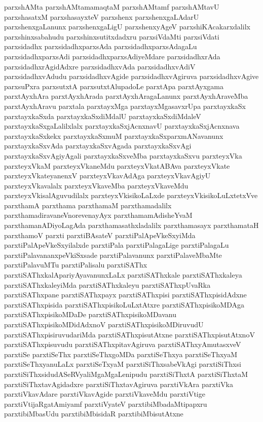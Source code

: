 {parxshAMta
parxshAMtamamaqtaM
parxshAMtamf
parxshAMtavU
parxshasatxM
parxshasayxteV
parxshenx
parxshenxgaLAdarU
parxshenxgaLanunx
parxshenxgaLigU
parxshenxyAgeV
parxshiKAcakarxdalilx
parxshinxsabahudu
parxshinxsutitxdadxru
parxsiVdaMti
parxsiVdati
parxsidadhx
parxsidadhxparxsAda
parxsidadhxparxsAdagaLu
parxsidadhxparxsAdi
parxsidadhxparxsAdiyeMdare
parxsidadhxrAda
parxsidadhxrAgidAdxre
parxsidadhxvAda
parxsidadhxvAdiV
parxsidadhxvAdudu
parxsidadhxvAgide
parxsidadhxvAgiruva
parxsidadhxvAgive
parxsuPxra
parxsutxtA
parxsutxtAlupadoLe
parxtApa
parxtAyxgama
parxtAyxhAra
parxtAyxhArada
parxtAyxhAragaLanunx
parxtAyxhAraveMba
parxtAyxhAravu
parxtala
parxtayxMga
parxtayxMgasavxrUpa
parxtayxkaSx
parxtayxkaSxda
parxtayxkaSxdiMdalU
parxtayxkaSxdiMdaleV
parxtayxkaSxgaLalilxlalx
parxtayxkaSxjAcnxnavU
parxtayxkaSxjAcnxnava
parxtayxkaSxkekx
parxtayxkaSxmuM
parxtayxkaSxparxmANavanunx
parxtayxkaSxvAda
parxtayxkaSxvAgada
parxtayxkaSxvAgi
parxtayxkaSxvAgiyAgali
parxtayxkaSxveMba
parxtayxkaSxvu
parxteyxVka
parxteyxVkaM
parxteyxVkaneMdu
parxteyxVkatABAva
parxteyxVkate
parxteyxVkateyanenxV
parxteyxVkavAdAga
parxteyxVkavAgiyU
parxteyxVkavalalx
parxteyxVkaveMba
parxteyxVkaveMdu
parxteyxVkisalAguvudilalx
parxteyxVkisikoLaLxde
parxteyxVkisikoLuLxtetxVve
parxthamA
parxthama
parxthamaM
parxthamadalilx
parxthamadiravaneVnorevenayAyx
parxthamamAdisheYvaM
parxthamanADiyoLagAda
parxthamasathxladalilx
parxthamasayx
parxthamataH
parxthamoV
parxti
parxtiBAsateV
parxtiPalApeVkeSxyiMda
parxtiPalApeVkeSxyilalxde
parxtiPala
parxtiPalagaLige
parxtiPalagaLu
parxtiPalavananxpeVkiSxsade
parxtiPalavanunx
parxtiPalaveMbaMte
parxtiPalavuMTu
parxtiPalisalu
parxtiSAThx
parxtiSAThxkalApariyAyavanunxLaLx
parxtiSAThxkale
parxtiSAThxkaleya
parxtiSAThxkaleyiMda
parxtiSAThxkaleyu
parxtiSAThxpUvaRka
parxtiSAThxpane
parxtiSAThxpayx
parxtiSAThxpisi
parxtiSAThxpisidAdxne
parxtiSAThxpisida
parxtiSAThxpisikoLuLxtAtxre
parxtiSAThxpisikoMDAga
parxtiSAThxpisikoMDaDe
parxtiSAThxpisikoMDavanu
parxtiSAThxpisikoMDidAdxnoV
parxtiSAThxpisikoMDiruvudU
parxtiSAThxpisiruvudariMda
parxtiSAThxpisutAtxne
parxtiSAThxpisutAtxnoV
parxtiSAThxpisuvudu
parxtiSAThxpitavAgiruva
parxtiSAThxyAmutasxveV
parxtiSe
parxtiSeThx
parxtiSeThxgoMDa
parxtiSeThxya
parxtiSeThxyaM
parxtiSeThxyanuLaLx
parxtiSeTxyaM
parxtiSiThxsabeVkAgi
parxtiSiThxsi
parxtiSiThxsidudASeRVyaliMgaMgaLenipudu
parxtiSiThxtA
parxtiSiThxtaM
parxtiSiThxtavAgidadxre
parxtiSiThxtavAgiruva
parxtiVkAra
parxtiVka
parxtiVkavAdare
parxtiVkavAgide
parxtiVkaveMdu
parxtiVtige
parxtiVtijaRgatAmiyamf
parxtiVyateV
parxtibiMbadaMtipapxru
parxtibiMbasUdu
parxtibiMbisidaR
parxtibiMbisutAtxne
}
